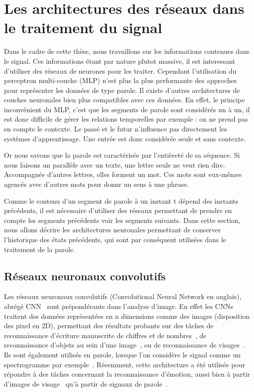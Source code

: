 \section{Les architectures des réseaux dans le traitement du signal}

Dans le cadre de cette thèse, nous travaillons sur les informations contenues dans le signal. Ces informations étant par nature plutot massive, il est interessant d'utiliser des réseaux de neurones pour les traiter. Cependant l'utilisation du perceptron multi-couche (MLP) n'est plus la plus performante des approches pour représenter les données de type parole. Il existe d'autres architectures de couches neuronales bien plus compatibles avec ces données. En effet, le principe inconvénient du MLP, c'est que les segments de parole sont considérés un à un, il est donc difficile de gérer les relations temporelles par exemple : on ne prend pas en compte le contexte. Le passé et le futur n'influence pas directement les systèmes d'apprentissage. Une entrée est donc considérée seule et sans contexte.

Or nous savons que la parole est caractérisée par l'entièreté de sa séquence. Si nous faisons un parallèle avec un texte, une lettre seule ne veut rien dire. Accompagnée d'autres lettres, elles forment un mot. Ces mots sont eux-mêmes agencés avec d'autres mots pour donnr un sens à une phrase.

Comme le contenu d'un segment de parole à un instant t dépend des instants précédents, il est nécessaire d'utiliser des réseaux permettant de prendre en compte les segments précédents voir les segments suivants. Dans cette section, nous allons décrire les architectures neuronales permettant de conserver l'historique des états précédents, qui sont par conséquent utilisées dans le traitement de la parole.

\subsection{Réseaux neuronaux convolutifs}
Les réseaux neuronaux convolutifs (Convolutional Neural Network en anglais), abrégé CNN~\cite{LeCun1989} sont prépondérants dans l'analyse d'image. En effet les CNNs traitent des données représentées en n dimensions comme des images (disposition des pixel en 2D), permettant des résultats probants sur des tâches de reconnaissance d'écriture manuscrite de chiffres et de nombres~\cite{LeCun1998}, de reconnaissance d'objets au sein d'une image~\cite{Traore2018}, ou de reconnaissance de visages~\cite{Liu2016}. Ils sont également utilisés en parole, lorsque l'on considère le signal comme un spectrogramme par exemple~\cite{Abdel2014}. Récemment, cette architecture a été utilisée pour répondre à des tâches concernant la reconnaissance d'émotion, aussi bien à partir d'images de visage~\cite{Pitaloka2017,Mehendale2020} qu'à partir de signaux de parole~\cite{Zhang2016}.

